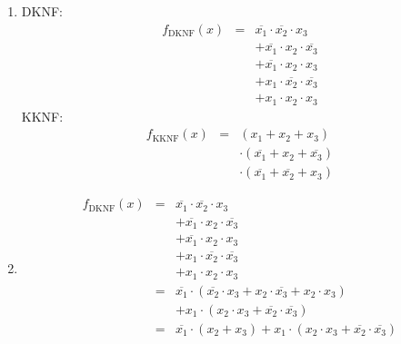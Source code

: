 \documentclass[DIN, pagenumber=false, fontsize=11pt, parskip=half]{scrartcl}
\begin{document}
    \subsection{}

    \subsection{}
    \begin{enumerate}[label=(\alph*)]
        \item
            DKNF:
            \begin{eqnarray*}
                f_\text{DKNF}(x) &=& \overline{x_1} \cdot \overline{x_2} \cdot x_3 \\
                &&+ \overline{x_1} \cdot x_2 \cdot \overline{x_3} \\
                &&+ \overline{x_1} \cdot x_2 \cdot x_3 \\
                &&+ x_1 \cdot \overline{x_2} \cdot \overline{x_3} \\
                &&+ x_1 \cdot x_2 \cdot x_3
            \end{eqnarray*}
            KKNF:
            \begin{eqnarray*}
                f_\text{KKNF}(x) &=& (x_1 + x_2 + x_3) \\
                &&\cdot (\overline{x_1} + x_2 + \overline{x_3})\\
                &&\cdot (\overline{x_1} + \overline{x_2} + x_3)
            \end{eqnarray*}
        \item
            \begin{eqnarray*}
                f_\text{DKNF}(x) &=& \overline{x_1} \cdot \overline{x_2} \cdot x_3 \\
                &&+ \overline{x_1} \cdot x_2 \cdot \overline{x_3} \\
                &&+ \overline{x_1} \cdot x_2 \cdot x_3 \\
                &&+ x_1 \cdot \overline{x_2} \cdot \overline{x_3} \\
                &&+ x_1 \cdot x_2 \cdot x_3\\
                &=& \overline{x_1} \cdot (\overline{x_2} \cdot x_3 + x_2 \cdot \overline{x_3} + x_2 \cdot x_3)\\
                &&+ x_1 \cdot (x_2 \cdot x_3 + \overline{x_2} \cdot \overline{x_3})\\
                &=& \overline{x_1} \cdot (x_2 + x_3) + x_1 \cdot (x_2 \cdot x_3 + \overline{x_2} \cdot \overline{x_3})\\

\end{eqnarray*}
\end{enumerate}
\end{document}
